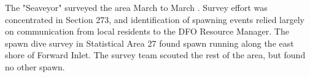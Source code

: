 The "Seaveyor" surveyed the area March  to March .
Survey effort was concentrated in Section 273, and
identification of spawning events relied largely on communication
from local residents to the DFO Resource Manager.
The spawn dive survey in Statistical Area 27 found spawn
running along the east shore of Forward Inlet.
The survey team scouted the rest of the area, but found no other spawn.
